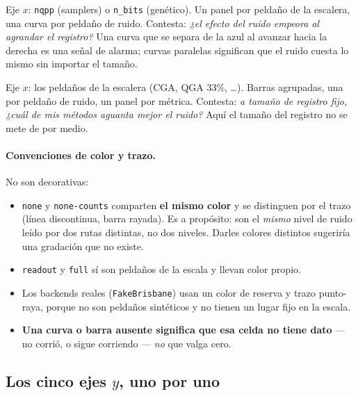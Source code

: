 \documentclass[11pt,a4paper]{article}
\begin{document}
\begin{description}[leftmargin=1.6em,style=nextline]
  \item[Tipo 1 y 2 --- \texttt{ruido\_vs\_rejilla\_*}.]
    Eje $x$: \texttt{nqpp} (samplers) o \texttt{n\_bits} (genético). Un panel
    por peldaño de la escalera, una curva por peldaño de ruido. Contesta:
    \emph{¿el efecto del ruido empeora al agrandar el registro?} Una curva
    que se separa de la azul al avanzar hacia la derecha es una señal de
    alarma; curvas paralelas significan que el ruido cuesta lo mismo sin
    importar el tamaño.
  \item[Tipo 3 --- \texttt{ruido\_fijo\_*}.]
    Eje $x$: los peldaños de la escalera (CGA, QGA 33\%, …). Barras
    agrupadas, una por peldaño de ruido, un panel por métrica. Contesta:
    \emph{a tamaño de registro fijo, ¿cuál de mis métodos aguanta mejor el
    ruido?} Aquí el tamaño del registro no se mete de por medio.
\end{description}

\paragraph{Convenciones de color y trazo.} No son decorativas:

\begin{itemize}[leftmargin=1.6em]
  \item \texttt{none} y \texttt{none-counts} comparten \textbf{el mismo
    color} y se distinguen por el trazo (línea discontinua, barra rayada).
    Es a propósito: son el \emph{mismo} nivel de ruido leído por dos rutas
    distintas, no dos niveles. Darles colores distintos sugeriría una
    gradación que no existe.
  \item \texttt{readout} y \texttt{full} sí son peldaños de la escala y
    llevan color propio.
  \item Los backends reales (\texttt{FakeBrisbane}) usan un color de reserva
    y trazo punto-raya, porque no son peldaños sintéticos y no tienen un
    lugar fijo en la escala.
  \item \textbf{Una curva o barra ausente significa que esa celda no tiene
    dato} --- no corrió, o sigue corriendo --- \emph{no} que valga cero.
\end{itemize}

\subsection{Los cinco ejes $y$, uno por uno}
\end{document}
